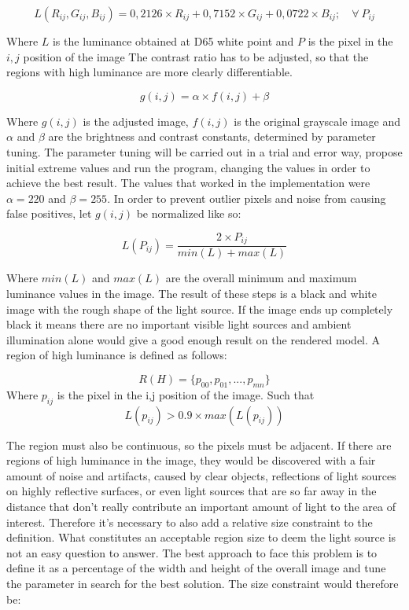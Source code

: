 \begin{equation}
    L(R_{ij},G_{ij},B_{ij}) = 0,2126 \times R_{ij} + 0,7152 \times G_{ij} + 0,0722 \times B_{ij}; \quad \forall \  P_{ij}
\end{equation}

Where $L$ is the luminance obtained at D65 white point and $P$ is the pixel in the $i,j$ position of the image \newline
The contrast ratio has to be adjusted, so that the regions with high luminance are more clearly differentiable. 

\begin{equation}
     g(i,j) = \alpha \times f(i,j) + \beta
\end{equation}

Where $g(i,j)$ is the adjusted image, $f(i,j)$ is the original grayscale image and $\alpha$ and $\beta$ are the brightness and contrast constants, determined by parameter tuning. The parameter tuning will be carried out in a trial and error way, propose initial extreme values and run the program, changing the values in order to achieve the best result. The values that worked in the implementation were $\alpha = 220$ and $\beta = 255$.
In order to prevent outlier pixels and noise from causing false positives, let $g(i,j)$ be normalized like so:

\begin{equation}
    L(P_{ij}) = \frac{ 2 \times P_{ij} }{min(L) + max(L)}
\end{equation}

Where $min(L)$ and $max(L)$ are the overall minimum and maximum luminance values in the image. 
\newline
The result of these steps is a black and white image with the rough shape of the light source. If the image ends up completely black it means there are no important visible light sources and ambient illumination alone would give a good enough result on the rendered model. A region of high luminance is defined as follows:

\begin{equation}
    R(H) = \{p_{00}, p_{01}, ... , p_{mn}\}
\end{equation}
 Where $p_{ij}$ is the pixel in the i,j position of the image. Such that 
\[
    L(p_{ij}) > 0.9 \times max(L(p_{ij})) 
\]

The region must also be continuous, so the pixels must be adjacent.\newline
If there are regions of high luminance in the image, they would be discovered with a fair amount of noise and artifacts, caused by clear objects, reflections of light sources on highly reflective surfaces, or even light sources that are so far away in the distance that don't really contribute an important amount of light to the area of interest. Therefore it's necessary to also add a relative size constraint to the definition. What constitutes an acceptable region size to deem the light source is not an easy question to answer. The best approach to face this problem is to define it as a percentage of the width and height of the overall image and tune the parameter in search for the best solution. The size constraint would therefore be:


